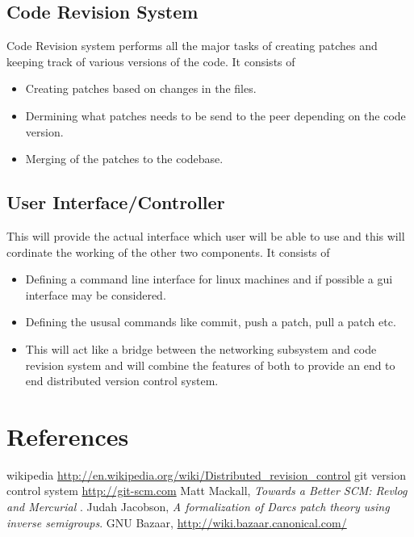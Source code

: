\documentclass[]{article}
\begin{document}
\subsection{Code Revision System}
Code Revision system performs all the major tasks of creating patches and
keeping track of various versions of the code. It consists of
\begin{itemize}
\item Creating patches based on changes in the files.
\item Dermining what patches needs to be send to the peer depending on the
  code version.
\item Merging of the patches to the codebase.
\end{itemize}
\subsection{User Interface/Controller}
This will provide the actual interface which user will be able to use and this
will cordinate the working of the other two components.
It consists of
\begin{itemize}
\item Defining a command line interface for linux machines and if possible a
  gui interface may be considered.
\item Defining the ususal commands like commit, push a patch, pull a patch
  etc.
\item This will act like a bridge between the networking subsystem and code
  revision system and will combine the features of both to provide an end to
  end distributed version control system.
\end{itemize}
\section{References}
\begin{thebibliography}{99}
wikipedia \url{http://en.wikipedia.org/wiki/Distributed_revision_control}
git version control system \url{http://git-scm.com}
Matt Mackall, \emph{Towards a Better SCM: Revlog and Mercurial} .
Judah Jacobson, \emph{A formalization of Darcs patch theory using inverse
  semigroups}.
GNU Bazaar, \url{http://wiki.bazaar.canonical.com/}
\end{thebibliography}
\end{document}
